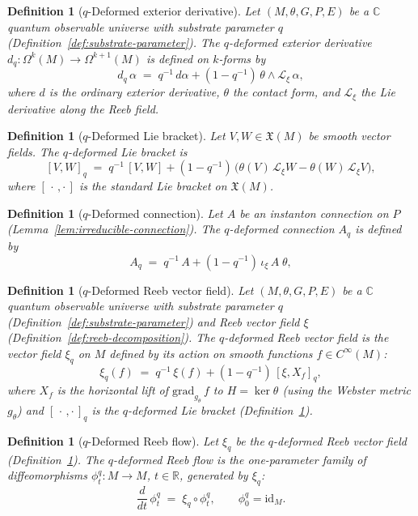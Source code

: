 \documentclass[12pt,a4paper]{report}
\newtheorem{definition}[theorem]{Definition}
\begin{document}
\begin{definition}[$q$-Deformed exterior derivative]
\label{def:q-ext-deriv}
Let $(M, \theta, G, P, E)$ be a $\mathbb{C}$ quantum observable universe
with substrate parameter $q$ (Definition~\ref{def:substrate-parameter}).
The \emph{$q$-deformed exterior derivative}
$d_q \colon \Omega^k(M) \to \Omega^{k+1}(M)$ is defined on $k$-forms by
\[
  d_q\,\alpha
  \;=\; q^{-1}\,d\alpha
        + (1 - q^{-1})\,\theta \wedge \mathcal{L}_\xi\,\alpha,
\]
where $d$ is the ordinary exterior derivative, $\theta$ the contact form,
and $\mathcal{L}_\xi$ the Lie derivative along the Reeb field.
\end{definition}

\begin{definition}[$q$-Deformed Lie bracket]
\label{def:q-lie-bracket}
Let $V, W \in \mathfrak{X}(M)$ be smooth vector fields.  The
\emph{$q$-deformed Lie bracket} is
\[
  [V, W]_q
  \;=\; q^{-1}\,[V, W]
        + (1 - q^{-1})\,\bigl(\theta(V)\,\mathcal{L}_\xi W
                              - \theta(W)\,\mathcal{L}_\xi V\bigr),
\]
where $[\,\cdot\,,\cdot\,]$ is the standard Lie bracket on $\mathfrak{X}(M)$.
\end{definition}

\begin{definition}[$q$-Deformed connection]
\label{def:q-connection}
Let $A$ be an instanton connection on $P$
(Lemma~\ref{lem:irreducible-connection}).  The \emph{$q$-deformed
connection} $A_q$ is defined by
\[
  A_q
  \;=\; q^{-1}\,A
        + (1 - q^{-1})\,\iota_\xi\,A\;\theta,
\]
\end{definition}

\begin{definition}[$q$-Deformed Reeb vector field]
\label{def:q-reeb-vector-field}
Let $(M, \theta, G, P, E)$ be a $\mathbb{C}$ quantum observable universe
with substrate parameter $q$ (Definition~\ref{def:substrate-parameter})
and Reeb vector field $\xi$ (Definition~\ref{def:reeb-decomposition}).  The
\emph{$q$-deformed Reeb vector field} is the vector field $\xi_q$ on $M$
defined by its action on smooth functions $f \in C^\infty(M)$:
\[
  \xi_q(f) \;=\; q^{-1}\,\xi(f) + (1 - q^{-1})\,[\xi, X_f]_q,
\]
where $X_f$ is the horizontal lift of $\mathrm{grad}_{g_\theta}\,f$ to
$H = \ker\theta$ (using the Webster metric $g_\theta$) and
$[\,\cdot\,,\cdot\,]_q$ is the $q$-deformed Lie bracket
(Definition~\ref{def:q-lie-bracket}).
\end{definition}

\begin{definition}[$q$-Deformed Reeb flow]
\label{def:q-reeb-flow}
Let $\xi_q$ be the $q$-deformed Reeb vector field
(Definition~\ref{def:q-reeb-vector-field}).  The \emph{$q$-deformed Reeb flow}
is the one-parameter family of diffeomorphisms
$\phi_t^q \colon M \to M$, $t \in \mathbb{R}$, generated by $\xi_q$:
\[
  \frac{d}{dt}\,\phi_t^q \;=\; \xi_q \circ \phi_t^q,
  \qquad \phi_0^q = \mathrm{id}_M.
\]
\end{definition}
\end{document}
